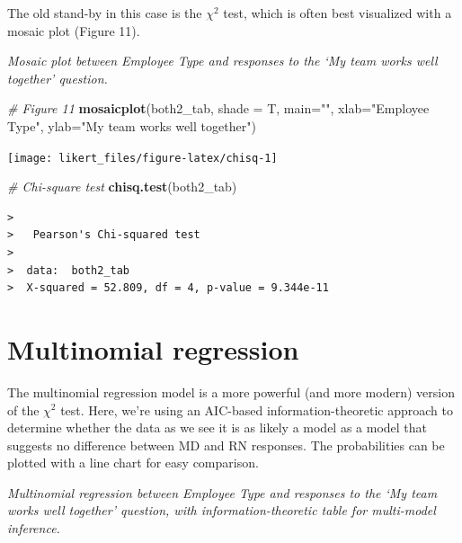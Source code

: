 \documentclass[]{book}
\newenvironment{Shaded}{\begin{snugshade}}{\end{snugshade}}
\newcommand{\KeywordTok}[1]{\textcolor[rgb]{0.13,0.29,0.53}{\textbf{{#1}}}}
\newcommand{\DataTypeTok}[1]{\textcolor[rgb]{0.13,0.29,0.53}{{#1}}}
\newcommand{\StringTok}[1]{\textcolor[rgb]{0.31,0.60,0.02}{{#1}}}
\newcommand{\CommentTok}[1]{\textcolor[rgb]{0.56,0.35,0.01}{\textit{{#1}}}}
\newcommand{\NormalTok}[1]{{#1}}
\begin{document}
The old stand-by in this case is the \(\chi^2\) test, which is often
best visualized with a mosaic plot (Figure 11).

\emph{Mosaic plot between Employee Type and responses to the `My team
works well together' question.}

\begin{Shaded}
\begin{Highlighting}[]
\CommentTok{# Figure 11}
\KeywordTok{mosaicplot}\NormalTok{(both2_tab, }\DataTypeTok{shade =} \NormalTok{T, }\DataTypeTok{main=}\StringTok{""}\NormalTok{, }\DataTypeTok{xlab=}\StringTok{"Employee Type"}\NormalTok{, }
  \DataTypeTok{ylab=}\StringTok{"My team works well together"}\NormalTok{)}
\end{Highlighting}
\end{Shaded}

\begin{center}\texttt{[image: likert\_files/figure-latex/chisq-1]} \end{center}

\begin{Shaded}
\begin{Highlighting}[]
\CommentTok{# Chi-square test}
\KeywordTok{chisq.test}\NormalTok{(both2_tab)}
\end{Highlighting}
\end{Shaded}

\begin{verbatim}
>  
>   Pearson's Chi-squared test
>  
>  data:  both2_tab
>  X-squared = 52.809, df = 4, p-value = 9.344e-11
\end{verbatim}

\hypertarget{Advanced}{\section{Multinomial regression}\label{Advanced}}

The multinomial regression model is a more powerful (and more modern)
version of the \(\chi^2\) test. Here, we're using an AIC-based
information-theoretic approach to determine whether the data as we see
it is as likely a model as a model that suggests no difference between
MD and RN responses. The probabilities can be plotted with a line chart
for easy comparison.

\emph{Multinomial regression between Employee Type and responses to the
`My team works well together' question, with information-theoretic table
for multi-model inference.}
\end{document}
